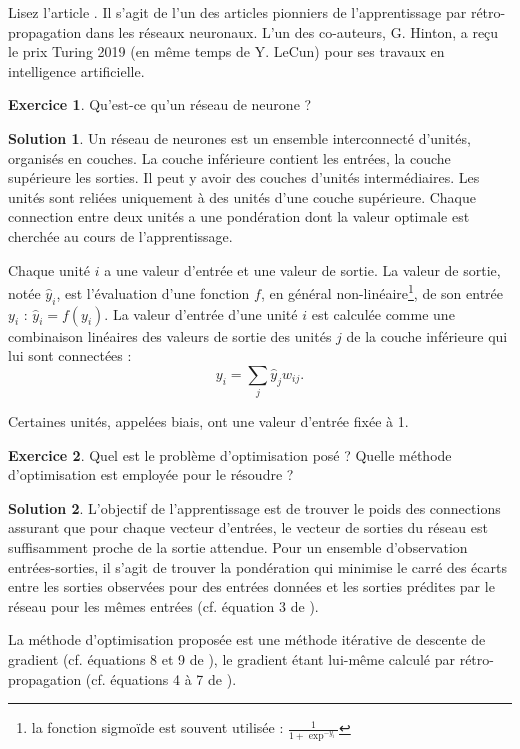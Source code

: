 \documentclass[a4paper,francais]{article}
\theoremstyle{definition}
\newtheorem{exercice}{Exercice}[section]
\newtheorem*{solution}{Solution}
\begin{document}
Lisez l'article \cite{hinton86}. Il s'agit de l'un des articles pionniers
de l'apprentissage par rétro-propagation dans les réseaux neuronaux. L'un des
co-auteurs, G. Hinton, a reçu le prix Turing 2019 (en même temps de Y. LeCun)
pour ses travaux en intelligence artificielle.  

\begin{exercice}
Qu'est-ce qu'un réseau de neurone ?
\end{exercice}

\begin{solution}
  Un réseau de neurones est un ensemble interconnecté d'unités, organisés en couches.
  La couche inférieure contient les entrées, la couche supérieure les sorties.
  Il peut y avoir des couches d'unités intermédiaires. Les unités sont reliées
  uniquement à des unités d'une couche supérieure. Chaque connection entre deux unités
  a une pondération dont la valeur optimale est cherchée au cours de l'apprentissage. 

  Chaque unité $i$ a une valeur d'entrée et une valeur de sortie. La valeur de sortie, notée $\hat{y}_i$,
  est l'évaluation d'une fonction $f$, en général non-linéaire\footnote{la fonction
    sigmoïde est souvent utilisée : $\frac{1}{1 + \exp^{-y_i}}$},
  de son entrée $y_i$ : $\hat{y}_i = f( y_i )$.
  La valeur d'entrée d'une unité $i$ est calculée comme une combinaison linéaires
  des valeurs de sortie des unités $j$ de la couche inférieure qui lui sont connectées : 
  \begin{equation}
    \label{eq:entree}
    y_i = \sum_j \hat{y}_j w_{ij}. 
  \end{equation}

  Certaines unités, appelées biais, ont une valeur d'entrée fixée à 1.
\end{solution}

\begin{exercice}
Quel est le problème d'optimisation posé ?
Quelle méthode d'optimisation est employée pour le résoudre ?
\end{exercice}

\begin{solution}
  L'objectif de l'apprentissage est de trouver le poids des connections assurant que
  pour chaque vecteur d'entrées, le vecteur de sorties du réseau est suffisamment proche
  de la sortie attendue. Pour un ensemble d'observation entrées-sorties, il s'agit de
  trouver la pondération qui minimise le carré des écarts entre les sorties observées
  pour des entrées données et les sorties prédites par le réseau pour les mêmes entrées
  (cf. équation 3 de \cite{hinton86}).

  La méthode d'optimisation proposée est une méthode itérative de descente de gradient
  (cf. équations 8 et 9 de \cite{hinton86}), le gradient étant lui-même calculé par
  rétro-propagation (cf. équations 4 à 7 de \cite{hinton86}).
\end{solution}



\end{document}
